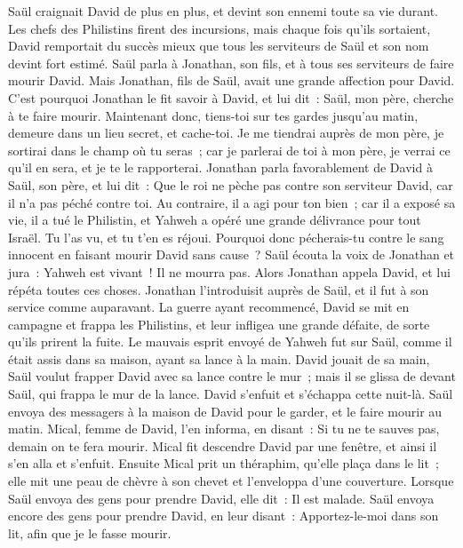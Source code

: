 \begin{multicols}{2}
Saül craignait David de plus en plus, et devint son ennemi toute sa vie durant.
Les chefs des Philistins firent des incursions, mais chaque fois qu'ils sortaient, David remportait du succès mieux que tous les serviteurs de Saül et son nom devint fort estimé.
\VerseOne{}Saül parla à Jonathan, son fils, et à tous ses serviteurs de faire mourir David.
Mais Jonathan, fils de Saül, avait une grande affection pour David. C'est pourquoi Jonathan le fit savoir à David, et lui dit~: Saül, mon père, cherche à te faire mourir. Maintenant donc, tiens-toi sur tes gardes jusqu'au matin, demeure dans un lieu secret, et cache-toi.
Je me tiendrai auprès de mon père, je sortirai dans le champ où tu seras~; car je parlerai de toi à mon père, je verrai ce qu'il en sera, et je te le rapporterai.
Jonathan parla favorablement de David à Saül, son père, et lui dit~: Que le roi ne pèche pas contre son serviteur David, car il n'a pas péché contre toi. Au contraire, il a agi pour ton bien~;
car il a exposé sa vie, il a tué le Philistin, et Yahweh a opéré une grande délivrance pour tout Israël. Tu l'as vu, et tu t'en es réjoui. Pourquoi donc pécherais-tu contre le sang innocent en faisant mourir David sans cause~?
Saül écouta la voix de Jonathan et jura~: Yahweh est vivant~! Il ne mourra pas.
Alors Jonathan appela David, et lui répéta toutes ces choses. Jonathan l'introduisit auprès de Saül, et il fut à son service comme auparavant.
La guerre ayant recommencé, David se mit en campagne et frappa les Philistins, et leur infligea une grande défaite, de sorte qu'ils prirent la fuite.
Le mauvais esprit envoyé de Yahweh fut sur Saül, comme il était assis dans sa maison, ayant sa lance à la main. David jouait de sa main,
Saül voulut frapper David avec sa lance contre le mur~; mais il se glissa de devant Saül, qui frappa le mur de la lance. David s'enfuit et s'échappa cette nuit-là.
Saül envoya des messagers à la maison de David pour le garder, et le faire mourir au matin. Mical, femme de David, l'en informa, en disant~: Si tu ne te sauves pas, demain on te fera mourir.
Mical fit descendre David par une fenêtre, et ainsi il s'en alla et s'enfuit.
Ensuite Mical prit un théraphim, qu'elle plaça dans le lit~; elle mit une peau de chèvre à son chevet et l'enveloppa d'une couverture.
Lorsque Saül envoya des gens pour prendre David, elle dit~: Il est malade.
Saül envoya encore des gens pour prendre David, en leur disant~: Apportez-le-moi dans son lit, afin que je le fasse mourir.

\end{multicols}
